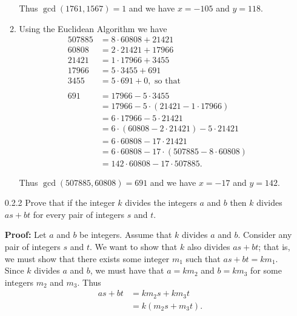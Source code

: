 \begin{enumerate}
\begin{enumerate}
               Thus $\gcd(1761, 1567) = 1$ and we have $x = -105$ and $y = 118$.
         \item Using the Euclidean Algorithm we have
               \begin{align*}
                  507885 &= 8 \cdot 60808 + 21421 \\
                  60808  &= 2 \cdot 21421 + 17966 \\
                  21421  &= 1 \cdot 17966 + 3455 \\
                  17966  &= 5 \cdot 3455 +  691 \\
                  3455   &= 5 \cdot 691 + 0, \text{ so that } \\ \\
                  691    &= 17966 - 5 \cdot 3455 \\
                         &= 17966 - 5 \cdot (21421 - 1 \cdot 17966) \\
                         &= 6 \cdot 17966 - 5 \cdot 21421 \\
                         &= 6 \cdot (60808 - 2 \cdot 21421) - 5 \cdot 21421 \\
                         &= 6 \cdot 60808 - 17 \cdot 21421 \\
                         &= 6 \cdot 60808 - 17 \cdot (507885 - 8 \cdot 60808) \\
                         &= 142 \cdot 60808 - 17 \cdot 507885.
               \end{align*}

               Thus $\gcd(507885, 60808) = 691$ and we have $x = -17$ and
               $y = 142$.
      \end{enumerate}
   \item[0.2.2]   Prove that if the integer $k$ divides the integers $a$ and $b$
                  then $k$ divides $as + bt$ for every pair of integers $s$ and
                  $t$.

      \textbf{Proof:} Let $a$ and $b$ be integers. Assume that $k$ divides
      $a$ and $b$. Consider any pair of integers $s$ and $t$. We want to show
      that $k$ also divides $as + bt$; that is, we must show that there exists
      some integer $m_1$ such that $as + bt = km_1$. Since $k$ divides $a$ and
      $b$, we must have that $a = km_2$ and $b = km_3$ for some integers $m_2$
      and $m_3$. Thus
      \begin{align*}
         as + bt &= km_2s + km_3t \\
                 &= k(m_2s + m_3t). 
      \end{align*}


\end{enumerate}
